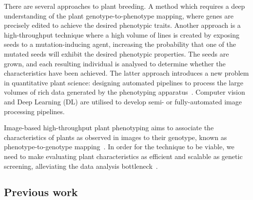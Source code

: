 There are several approaches to plant breeding.
A method which requires a deep understanding of the plant genotype-to-phenotype mapping, where genes are precisely edited to achieve the desired phenotypic traits.
Another approach is a high-throughput technique where a high volume of lines is created by exposing seeds to a mutation-inducing agent, increasing the probability that one of the mutated seeds will exhibit the desired phenotypic properties.
The seeds are grown, and each resulting individual is analysed to determine whether the characteristics have been achieved.
The latter approach introduces a new problem in quantitative plant science: designing automated pipelines to process the large volumes of rich data generated by the phenotyping apparatus~\cite{furbankPhenomicsTechnologiesRelieve2011, grosskinskyPlantPhenomicsNeed2015, houlePhenomicsNextChallenge2010}.
Computer vision and Deep Learning (DL) are utilised to develop semi- or fully-automated image processing pipelines.

Image-based high-throughput plant phenotyping aims to associate the characteristics of plants as observed in images to their genotype, known as phenotype-to-genotype mapping~\cite{liReviewImagingTechniques2014}. 
In order for the technique to be viable, we need to make evaluating plant characteristics as efficient and scalable as genetic screening, alleviating the data analysis bottleneck~\cite{millerComputerVisionAnalysis2007, fahlgrenLightsCameraAction2015}.

\subsection{Previous work}\label{subsec:previous-work}



